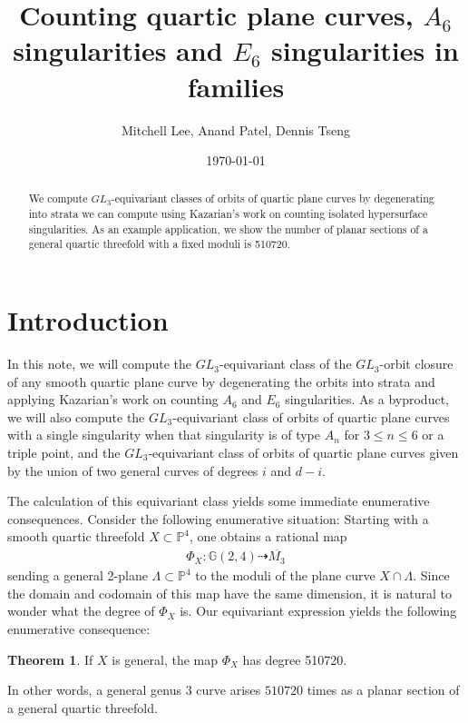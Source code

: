 \documentclass{article}
\title{Counting quartic plane curves, $A_6$ singularities and $E_6$ singularities in families}
\author{Mitchell Lee, Anand Patel, Dennis Tseng}
\date{\today}
\theoremstyle{definition}
\newtheorem{thm}{Theorem}[section]
\newcommand{\mb}{\mathbb}
\begin{document}
\maketitle

\begin{abstract}
    We compute $GL_3$-equivariant classes of orbits of quartic plane curves by degenerating into strata we can compute using Kazarian's work on counting isolated hypersurface singularities. As an example application, we show the number of planar sections of a general quartic threefold with a fixed moduli is 510720.
\end{abstract}

\section{Introduction}
In this note, we will compute the $GL_3$-equivariant class of the $GL_3$-orbit closure of any smooth quartic plane curve by degenerating the orbits into strata and applying Kazarian's work \cite{Kazarian} on counting $A_6$ and $E_6$ singularities. As a byproduct, we will also compute the $GL_3$-equivariant class of orbits of quartic plane curves with a single singularity when that singularity is of type $A_n$ for $3\leq n\leq 6$ or a triple point, and the $GL_3$-equivariant class of orbits of quartic plane curves given by the union of two general curves of degrees $i$ and $d-i$. 

The calculation of this equivariant class yields some immediate enumerative consequences. Consider the following enumerative situation: Starting with a smooth quartic threefold $X\subset \mathbb{P}^4$, one obtains a rational map 
\begin{align*}
   \Phi_{X}:  \mb{G}(2,4)\dashrightarrow \overline{M_3}
\end{align*}
sending a general 2-plane $\Lambda\subset\mathbb{P}^4$ to the moduli of the plane curve $X\cap \Lambda$.  Since the domain and codomain of this map have the same dimension, it is natural to wonder what the degree of $\Phi_{X}$ is.  Our equivariant expression yields the following enumerative consequence:
\begin{thm}
\label{numberplanesection}
If $X$ is general, the map $\Phi_{X}$ has degree 510720.
\end{thm}
In other words, a general genus $3$ curve arises $510720$ times as a planar section of a general quartic threefold.
\end{document}
